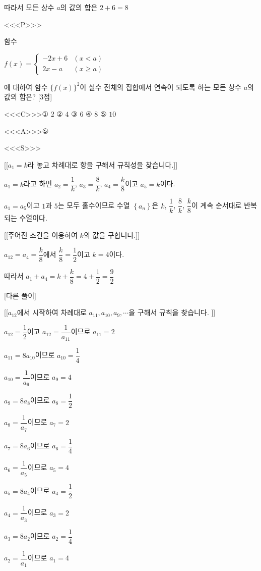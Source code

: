 \documentclass{oblivoir}
\begin{document}
따라서 모든 상수 $a$의 값의 합은 $2+6=8$

<<<P>>>

함수 

$f(x)=\begin{cases}
-2x+6&(x< a)\\
2x-a&(x\ge a)
\end{cases}$

에 대하여 함수 $\{f(x)\}^{2}$이 실수 전체의 집합에서 연속이 되도록 하는 모든 상수 $a$의 값의 합은? [3점]

<<<C>>>① $2$ ② $4$ ③ $6$ ④ $8$ ⑤ $10$

<<<A>>>⑤

<<<S>>>

[[$a_{1}=k$라 놓고 차례대로 항을 구해서 규칙성을 찾습니다.]]

$a_{1}=k$라고 하면 $a_{2}=\dfrac{1}{k}$, $a_{3}=\dfrac{8}{k}$, $a_{4}=\dfrac{k}{8}$이고 $a_{5}=k$이다.

$a_{1}=a_{5}$이고 $1$과 $5$는 모두 홀수이므로 수열 $\left\{a_{n}\right\}$은 $k$, $\dfrac{1}{k}$, $\dfrac{8}{k}$, $\dfrac{k}{8}$이 계속 순서대로 반복되는 수열이다.

[[주어진 조건을 이용하여 $k$의 값을 구합니다.]]

$a_{12}=a_{4}=\dfrac{k}{8}$에서 $\dfrac{k}{8}=\dfrac{1}{2}$이고 $k=4$이다.

따라서 $a_{1}+a_{4}=k +\dfrac{k}{8}=4+\dfrac{1}{2}=\dfrac{9}{2}$

[다른 풀이]

[[$a_{12}$에서 시작하여 차례대로 $a_{11},a_{10},a_{9},\cdots$을 구해서 규칙을 찾습니다. ]]

$a_{12}=\dfrac{1}{2}$이고 $a_{12}=\dfrac{1}{a_{11}}$이므로 $a_{11}=2$

$a_{11}=8a_{10}$이므로 $a_{10}=\dfrac{1}{4}$

$a_{10}=\dfrac{1}{a_{9}}$이므로 $a_{9}=4$

$a_{9}= 8a_{8}$이므로 $a_{8}=\dfrac{1}{2}$

$a_{8}=\dfrac{1}{a_{7}}$이므로 $a_{7}=2$

$a_{7}= 8a_{6}$이므로 $a_{6}=\dfrac{1}{4}$

$a_{6}=\dfrac{1}{a_{5}}$이므로 $a_{5}=4$

$a_{5}= 8a_{4}$이므로 $a_{4}=\dfrac{1}{2}$

$a_{4}=\dfrac{1}{a_{3}}$이므로 $a_{3}=2$

$a_{3}= 8a_{2}$이므로 $a_{2}=\dfrac{1}{4}$

$a_{2}=\dfrac{1}{a_{1}}$이므로 $a_{1}=4$
\end{document}
